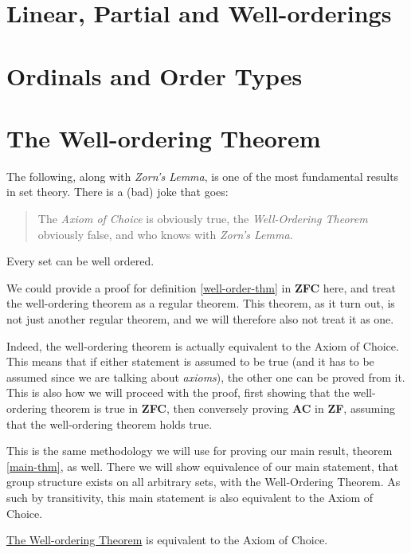 \documentclass[../../main.tex]{subfiles}
\begin{document}
\section{Linear, Partial and Well-orderings}

\section{Ordinals and Order Types}

\section{The Well-ordering Theorem}
The following, along with \textit{Zorn's Lemma}, is one of the most fundamental results in set theory.
There is a (bad) joke that goes:
\begin{quote} %
    The \textit{Axiom of Choice} is obviously true, the \textit{Well-Ordering Theorem} obviously false, 
    and who knows with \textit{Zorn's Lemma}.
\end{quote}

\begin{definition}\cite[Theorem 15]{Jec78}\label{well-order-thm}
    Every set can be well ordered.
\end{definition}

We could provide a proof for definition \ref{well-order-thm} in \textbf{ZFC} here, 
and treat the well-ordering theorem as a regular theorem.
This theorem, as it turn out, is not just another regular theorem, and we will therefore also not treat it as one.

Indeed, the well-ordering theorem is actually equivalent to the Axiom of Choice.
This means that if either statement is assumed to be true (and it has to be assumed since we are talking about \textit{axioms}),
the other one can be proved from it.
This is also how we will proceed with the proof, first showing that the well-ordering theorem is true in \textbf{ZFC},
then conversely proving \textbf{AC} in \textbf{ZF}, assuming that the well-ordering theorem holds true.

This is the same methodology we will use for proving our main result, theorem \ref{main-thm}, as well.
There we will show equivalence of our main statement, that group structure exists on all arbitrary sets, with the Well-Ordering Theorem.
As such by transitivity, this main statement is also equivalent to the Axiom of Choice.

\begin{theorem}
    \hyperref[well-order-thm]{The Well-ordering Theorem} is equivalent to the Axiom of Choice. %
\end{theorem}
\end{document}
